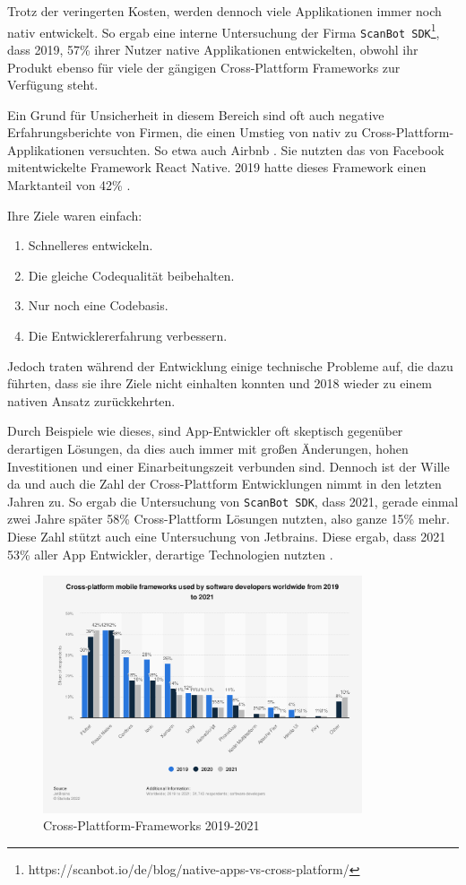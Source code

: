 Trotz der veringerten Kosten, werden dennoch viele Applikationen immer noch nativ entwickelt. So ergab eine interne Untersuchung der Firma \verb|ScanBot SDK|\footnote{https://scanbot.io/de/blog/native-apps-vs-cross-platform/}, dass 2019, 57\% ihrer Nutzer native Applikationen entwickelten, obwohl ihr Produkt ebenso für viele der gängigen Cross-Plattform Frameworks zur Verfügung steht.

Ein Grund für Unsicherheit in diesem Bereich sind oft auch negative Erfahrungsberichte von Firmen, die einen Umstieg von nativ zu Cross-Plattform-Applikationen versuchten.  So etwa auch Airbnb \cite{Airbnb_react_goals}. Sie nutzten das von Facebook mitentwickelte Framework React Native. 2019 hatte dieses Framework einen Marktanteil von 42\% \cite{statist_CP_Framework}. 

Ihre Ziele waren einfach:
\begin{enumerate}
    \item Schnelleres entwickeln.
    \item Die gleiche Codequalität beibehalten.
    \item Nur noch eine Codebasis.
    \item Die Entwicklererfahrung verbessern.
\end{enumerate}
Jedoch traten während der Entwicklung einige technische Probleme auf, die dazu führten, dass sie ihre Ziele nicht einhalten konnten und 2018 wieder zu einem nativen Ansatz zurückkehrten.

Durch Beispiele wie dieses, sind App-Entwickler oft skeptisch gegenüber derartigen Lösungen, da dies auch immer mit großen Änderungen, hohen Investitionen und einer  Einarbeitungszeit verbunden sind. Dennoch ist der Wille da und auch die Zahl der Cross-Plattform Entwicklungen nimmt in den letzten Jahren zu. So ergab die Untersuchung von \verb|ScanBot SDK|, dass 2021, gerade einmal zwei Jahre später 58\% Cross-Plattform Lösungen nutzten, also ganze 15\% mehr. Diese Zahl stützt auch eine Untersuchung von Jetbrains. Diese ergab, dass 2021 53\% aller App Entwickler, derartige Technologien nutzten \cite{JetBrains_miscellaneous_2021}.

\begin{figure}[ht]
  \centering
  \includegraphics[height=7cm,keepaspectratio]{images/cross-platform-mobile-frameworks.png} 
  \caption[Statistik Cross-Plattform-Frameworks]{Cross-Plattform-Frameworks 2019-2021 \cite{statist_CP_Framework}}
  \label{fig:statista_cross_plattform}
\end{figure}

